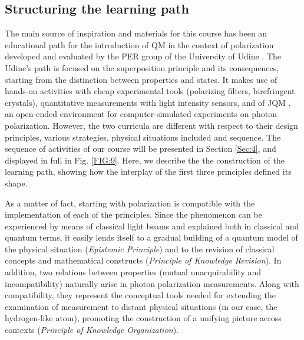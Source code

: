 \documentclass[twocolumn,secnumarabic,amssymb, nobibnotes, aps, prd, nofootinbib]{revtex4-2}
\begin{document}
\subsection{Structuring the learning path} \label{Sec:3.1}
The main source of inspiration and materials for this course has been an educational path for the introduction of QM in the context of polarization developed and evaluated by the PER group of the University of Udine \cite[e.g.,][]{Ghirardi1996, Michelini2004, Michelini2019}. The Udine's path is focused on the superposition principle and its consequences, starting from the distinction between properties and states. It makes use of hands-on activities with cheap experimental tools (polarizing filters, birefringent crystals), quantitative measurements with light intensity sensors, and of JQM \cite{Michelini2002}, an open-ended environment for computer-simulated experiments on photon polarization. However, the two curricula are different with respect to their design principles, various strategies, physical situations included and sequence. The sequence of activities of our course will be presented in Section \ref{Sec:4}, and displayed in full in Fig. \ref{FIG:9}. Here, we describe the the construction of the learning path, showing how the interplay of the first three principles defined its shape.

As a matter of fact, starting with polarization is compatible with the implementation of each of the principles. Since the phenomenon can be experienced by means of classical light beams and explained both in classical and quantum terms, it easily lends itself to a gradual building of a quantum model of the physical situation (\textit{Epistemic Principle}) and to the revision of classical concepts and mathematical constructs (\textit{Principle of Knowledge Revision}). In addition, two relations between properties (mutual unacquirability and incompatibility) naturally arise in photon polarization measurements. Along with compatibility, they represent the conceptual tools needed for extending the examination of measurement to distant physical situations (in our case, the hydrogen-like atom), promoting the construction of a unifying picture across contexts (\textit{Principle of Knowledge Organization}).
\end{document}
